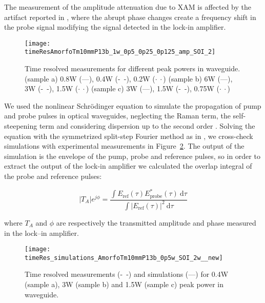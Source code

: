 The measurement of the amplitude attenuation due to XAM is affected by the artifact reported in \cite{Vallaitis2009}, where the abrupt phase changes create a frequency shift in the probe signal modifying the signal detected in the lock-in amplifier.


\begin{figure}[htb]
    \centering
    \texttt{[image: timeResAmorfoTm10mmP13b\_1w\_0p5\_0p25\_0p125\_amp\_SOI\_2]}
    \caption{Time resolved measurements for different peak powers in waveguide. (sample a) 0.8W (---), 0.4W (-~-), 0.2W ($\cdot~\cdot$) (sample b) 6W (---), 3W (-~-), 1.5W ($\cdot~\cdot$) (sample c) 3W (---), 1.5W (-~-), 0.75W ($\cdot~\cdot$) }
    \label{fig:timeResolvesMeasurements}
\end{figure}



We used the nonlinear Schr\"{o}dinger equation to simulate the propagation of pump and probe pulses in optical waveguides, neglecting the Raman term, the self-steepening term and considering dispersion up to the second order \cite{Agrawal2001a}.
Solving the equation with the symmetrized split-step Fourier method as in \cite{Lin2007,Matres:12}, we cross-check simulations with experimental measurements in Figure~\ref{fig:timeResolvesSimulations}.
The output of the simulation is the envelope of the pump, probe and reference pulses, so in order to extract the output of the lock-in amplifier we calculated the overlap integral of the probe and reference pulses:


\begin{equation}
        |T_{A}|e^{j\phi} =
        \frac{\int E_{\mathrm{ref}}(\tau) E^*_{\mathrm{probe}}(\tau) ~ \mathrm{d}\tau}
        {\int |E_{\mathrm{ref}}(\tau)|^2~\mathrm{d}\tau}
\end{equation}


where $T_A$ and $\phi$ are respectively the transmitted amplitude and phase measured in the lock--in amplifier.


\begin{figure}[htb]
    \centering
    \texttt{[image: timeRes\_simulations\_AmorfoTm10mmP13b\_0p5w\_SOI\_2w\_\_new]}
    \caption{Time resolved measurements (-~-) and simulations (---) for 0.4W (sample a), 3W (sample b) and 1.5W (sample c) peak power in waveguide.}
    \label{fig:timeResolvesSimulations}
\end{figure}



